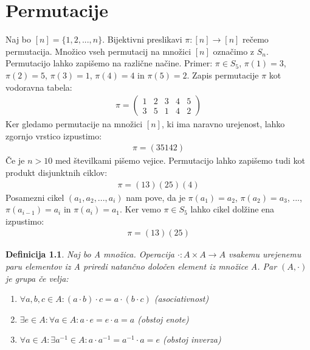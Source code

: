 \documentclass[a4paper, 12pt]{book}
\newtheorem{definicija}{Definicija}[chapter]
\begin{document}
\chapter{ Permutacije }
Naj bo $[n] = \{ 1, 2, ..., n \}$. 
Bijektivni preslikavi $\pi: [n] \rightarrow [n]$ rečemo permutacija. 
Množico vseh permutacij na množici $[n]$ označimo z $S_n$.
Permutacijo lahko zapišemo na različne načine. 
Primer: $\pi \in S_5$, $\pi(1) = 3$, $\pi(2) = 5$, $\pi(3) = 1$, $\pi(4) = 4$ in $\pi(5) = 2$.
Zapis permutacije $\pi$ kot vodoravna tabela:
\begin{align}
    \pi = \begin{pmatrix}
        1 & 2 & 3 & 4 & 5 \\
        3 & 5 & 1 & 4 & 2
    \end{pmatrix}
\end{align}
Ker gledamo permutacije na množici $[n]$, ki ima naravno urejenost, lahko zgornjo vrstico izpustimo:
\begin{align}
    \pi = (3 5 1 4 2)
\end{align}
Če je $n > 10$ med številkami pišemo vejice.
Permutacijo lahko zapišemo tudi kot produkt disjunktnih ciklov:
\begin{align}
    \pi = (1 3)(2 5)(4)
\end{align}
Posamezni cikel $(a_1, a_2, ..., a_i)$ nam pove, da je $\pi(a_1) = a_2$, $\pi(a_2) = a_3$, ..., $\pi(a_{i-1}) = a_i$ in $\pi(a_i) = a_1$.
Ker vemo $\pi \in S_5$ lahko cikel dolžine ena izpustimo:
\begin{align}
    \pi = (1 3)(2 5)
\end{align}


\begin{definicija}
    Naj bo A množica. 
    Operacija $\cdot:A \times A \rightarrow A$ vsakemu urejenemu paru elementov iz A priredi natančno določen element iz množice A. 
    Par $(A, \cdot)$ je grupa če velja:
    \begin{enumerate}
        \item $\forall a, b, c \in A: (a \cdot b) \cdot c = a \cdot (b \cdot c)$ (asociativnost)
        \item $\exists e \in A: \forall a \in A: a \cdot e = e \cdot a = a$ (obstoj enote)
        \item $\forall a \in A: \exists a^{-1} \in A: a \cdot a^{-1} = a^{-1} \cdot a = e$ (obstoj inverza)
        
    \end{enumerate}

\end{definicija}
\end{document}
